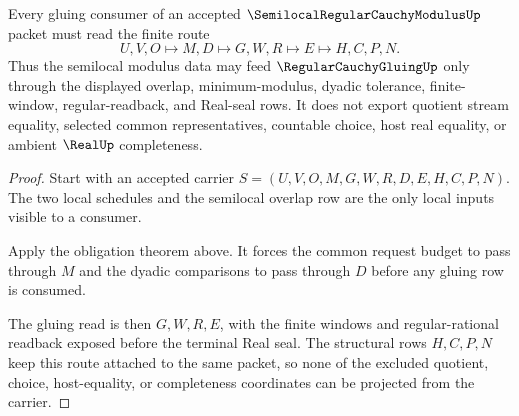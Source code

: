 \begin{theorem}
\label{thm:semilocal-regular-cauchy-modulus-gluing-scope}
Every gluing consumer of an accepted $\SemilocalRegularCauchyModulusUp$ packet must read the finite route
$$
U,V,O \longmapsto M,D \longmapsto G,W,R \longmapsto E \longmapsto H,C,P,N .
$$
Thus the semilocal modulus data may feed $\RegularCauchyGluingUp$ only through the displayed overlap, minimum-modulus, dyadic tolerance, finite-window, regular-readback, and Real-seal rows. It does not export quotient stream equality, selected common representatives, countable choice, host real equality, or ambient $\RealUp$ completeness.
\end{theorem}
\begin{proof}
Start with an accepted carrier $S=(U,V,O,M,G,W,R,D,E,H,C,P,N)$. The two local schedules and the semilocal overlap row are the only local inputs visible to a consumer.

Apply the obligation theorem above. It forces the common request budget to pass through $M$ and the dyadic comparisons to pass through $D$ before any gluing row is consumed.

The gluing read is then $G,W,R,E$, with the finite windows and regular-rational readback exposed before the terminal Real seal. The structural rows $H,C,P,N$ keep this route attached to the same packet, so none of the excluded quotient, choice, host-equality, or completeness coordinates can be projected from the carrier.
\end{proof}




